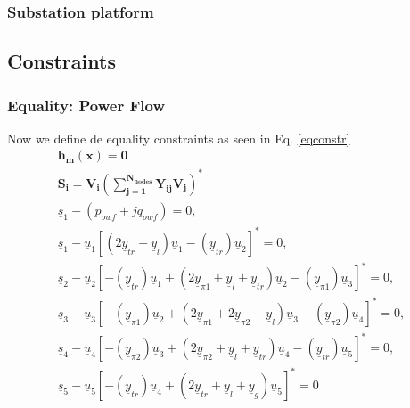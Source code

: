 \documentclass[a4paper,11pt, titlepage, twoside]{article}
\begin{document}
\subsubsection{Substation platform}

\subsection{Constraints}
\subsubsection{Equality: Power Flow}

Now we define de equality constraints as seen in  Eq. \ref{eqconstr}
\begin{gather}
    \mathbf{h_m(x) = 0 } \label{eqconstr} \\
    \mathbf{S_i} = \mathbf{V_i(\sum_{j=1}^{N_{nodes}}Y_{ij}V_j)^*} \\
    \underline{s}_1-(p_{owf}+jq_{owf}) = 0, \nonumber \\
    \underline{s}_1-\underline{u}_1[(2\underline{y}_{tr}+\underline{y}_l)\underline{u}_1-(\underline{y}_{tr})\underline{u}_2]^* = 0, \nonumber \\
    \underline{s}_2-\underline{u}_2[-(\underline{y}_{tr})\underline{u}_1+(2\underline{y}_{\pi1}+\underline{y}_l+\underline{y}_{tr})\underline{u}_2-(\underline{y}_{\pi1})\underline{u}_3]^* = 0, \nonumber \\
    \underline{s}_3-\underline{u}_3[-(\underline{y}_{\pi1})\underline{u}_2+(2\underline{y}_{\pi1}+2\underline{y}_{\pi2}+\underline{y}_{l})\underline{u}_3-(\underline{y}_{\pi2})\underline{u}_4]^* = 0, \nonumber \\
    \underline{s}_4-\underline{u}_4[-(\underline{y}_{\pi2})\underline{u}_3+(2\underline{y}_{\pi2}+\underline{y}_l+\underline{y}_{tr})\underline{u}_4-(\underline{y}_{tr})\underline{u}_5]^* = 0, \nonumber \\
    \underline{s}_5-\underline{u}_5[-(\underline{y}_{tr})\underline{u}_4+(2\underline{y}_{tr}+\underline{y}_l+\underline{y}_{g})\underline{u}_5]^* = 0
\end{gather}

\newpage
\end{document}
